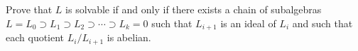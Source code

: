 Prove that $L$ is solvable if and only if there exists a chain of subalgebras $L = L_0 \supset L_1 \supset L_2 \supset \cdots \supset L_k = 0$ such that $L_{i+1}$ is an ideal of $L_i$ and such that each quotient $L_i/L_{i+1}$ is abelian.

